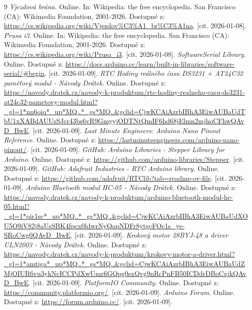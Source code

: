 \documentclass[12pt, a4paper,
twoside,        %
openright
]{report}
\renewcommand{\refname}{Seznam použitých internetových zdrojů}
\begin{document}
	\renewcommand{\refname}{Seznam použitých internetových zdrojů}
	\begin{thebibliography}{9}
		\textit{Vjezdová brána.} Online. In: Wikipedia: the free encyclopedia. San Francisco (CA): Wikimedia Foundation, 2001-2026. Dostupné z: \url{https://cs.wikipedia.org/wiki/Vjezdov%C3%A1_br%C3%A1na}. [cit. 2026-01-08].
		\textit{Prusa i3}. Online. In: Wikipedia: the free encyclopedia. San Francisco (CA): Wikimedia Foundation, 2001-2026. Dostupné z: \url{https://cs.wikipedia.org/wiki/Prusa_i3}. [cit. 2026-01-08].
		\textit{SoftwareSerial Library}. Online. Dostupné z: \url{https://docs.arduino.cc/learn/built-in-libraries/software-serial/#begin}. [cit. 2026-01-09].
		\textit{RTC Hodiny reálného času DS3231 + AT24C32 paměťový modul - Návody Drátek.} Online. Dostupné z: \url{https://navody.dratek.cz/navody-k-produktum/rtc-hodiny-realneho-casu-ds3231-at24c32-pametovy-modul.html?_gl=1*nn6oiq*_up*MQ..*_gs*MQ..&gclid=CjwKCAiAzrbIBhA3EiwAUBaUdTbU1xXABdAUUsSJcr43bs6vR9GmyyjODTNtQmIF6hd68jElmn2mjhoCFhwQAvD_BwE}. [cit. 2026-01-09].
		 \textit{Last Minute Engineers: Arduino Nano Pinout Reference.} Online. Dostupné z: \url{https://lastminuteengineers.com/arduino-nano-pinout/}. [cit. 2026-01-09].
		 \textit{GitHub: Arduino Libraries - Stepper Library for Arduino.}  Online. Dostupné z: \url{https://github.com/arduino-libraries/Stepper}. [cit. 2026-01-09].
		\textit{GitHub: Adafruit Industries - RTC Arduino library.} Online. Dostupné z: \url{https://github.com/adafruit/RTClib?tab=readme-ov-file}. [cit. 2026-01-09].
		\textit{Arduino Bluetooth modul HC-05 - Návody Drátek.} Online. Dostupné z: \url{https://navody.dratek.cz/navody-k-produktum/arduino-bluetooth-modul-hc-05.html?_gl=1*qir1sc*_up*MQ..*_gs*MQ..&gclid=CjwKCAiAzrbIBhA3EiwAUBaUdXOU5O9iV82j8aUsSBK4fpcx0ldwrNyQapNDFr8ytgcFOc1s_ye-SRoCwg0QAvD_BwE}. [cit. 2026-01-09].
		\textit{Krokový motor 28BYJ-48 a driver ULN2003 - Návody Drátek.} Online. Dostupné z: \url{https://navody.dratek.cz/navody-k-produktum/krokovy-motor-a-driver.html?_gl=1*amtiga*_up*MQ..*_gs*MQ..&gclid=CjwKCAiAzrbIBhA3EiwAUBaUdZMjOIUR6vu3ykNcICCPdXwUmr6GQpg0sxQvg9nRcPnFB50ICDdrDBoCxjkQAvD_BwE}. [cit. 2026-01-09].
		\textit{PlatformIO Community.} Online. Dostupné z: \url{https://community.platformio.org/}. [cit. 2026-01-09].
		\textit{Arduino Forum.} Online. Dostupné z: \url{https://forum.arduino.cc/}. [cit. 2026-01-09].
	\end{thebibliography}
	
\end{document}
